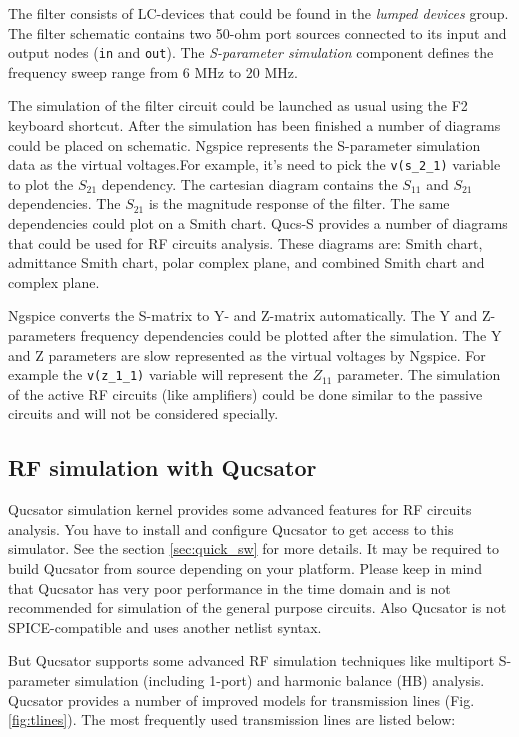 \documentclass[a4paper,12pt]{article}
\begin{document}
The filter consists of LC-devices that could be found in the \emph{lumped devices} group. The filter schematic contains two 50-ohm port sources connected to its input and output nodes (\verb|in| and \verb|out|). The \emph{S-parameter simulation} component defines the frequency sweep range from 6 MHz to 20 MHz.
    
The simulation of the filter circuit could be launched as usual using the F2 keyboard shortcut. After the simulation has been finished a number of diagrams could be placed on schematic. Ngspice represents the S-parameter simulation data as the virtual voltages.For example, it's need to pick the \verb|v(s_2_1)| variable to plot the $S_{21}$ dependency. The cartesian diagram contains the $S_{11}$ and $S_{21}$ dependencies. The $S_{21}$ is the magnitude response of the filter. The same dependencies could plot on a Smith chart. Qucs-S provides a number of diagrams that could be used for RF circuits analysis. These diagrams are: Smith chart, admittance Smith chart, polar complex plane, and combined Smith chart and complex plane. 

Ngspice converts the S-matrix to Y- and Z-matrix automatically. The Y and Z-parameters frequency dependencies could be plotted after the simulation. The Y and Z parameters are slow represented as the virtual voltages by Ngspice. For example the \verb|v(z_1_1)| variable will represent the $Z_{11}$ parameter. The simulation of the active RF circuits (like amplifiers) could be done similar to the passive circuits and will not be considered specially.     

\subsection{RF simulation with Qucsator}

Qucsator simulation kernel provides some advanced features for RF circuits analysis. You have to install and configure Qucsator to get access to this simulator. See the section \ref{sec:quick_sw} for more details. It may be required to build Qucsator from source depending on your platform. Please keep in mind that Qucsator has very poor performance in the time domain and is not recommended for simulation of the general purpose circuits. Also Qucsator is not SPICE-compatible and uses another netlist syntax.

But Qucsator supports some advanced RF simulation techniques like multiport S-parameter simulation (including 1-port) and harmonic balance (HB) analysis. Qucsator provides a number of improved models for transmission lines (Fig. \ref{fig:tlines}). The most frequently used transmission lines are listed below: 
\end{document}
